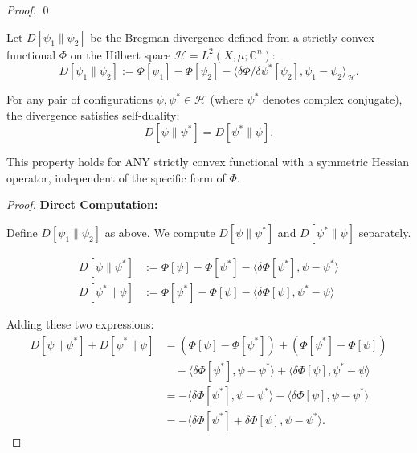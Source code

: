 \begin{theorem}
\begin{lemma}
\begin{proof}
\qed

\end{proof}

\end{lemma}

\begin{lemma}
\label{lem:bregmanSelfDualityUnderConjugation}

Let $D[\psi_1 \| \psi_2]$ be the Bregman divergence defined from a strictly convex functional $\Phi$ on the Hilbert space $\mathcal{H} = L^2(X, \mu; \mathbb{C}^n)$:
\begin{equation}
D[\psi_1 \| \psi_2] := \Phi[\psi_1] - \Phi[\psi_2] - \langle \delta\Phi/\delta\psi^*[\psi_2], \psi_1 - \psi_2 \rangle_{\mathcal{H}}.
\end{equation}

For any pair of configurations $\psi, \psi^* \in \mathcal{H}$ (where $\psi^*$ denotes complex conjugate), the divergence satisfies self-duality:
\begin{equation}
D[\psi \| \psi^*] = D[\psi^* \| \psi].
\end{equation}

This property holds for ANY strictly convex functional with a symmetric Hessian operator, independent of the specific form of $\Phi$.

\begin{proof}

\textbf{Direct Computation:}

Define $D[\psi_1 \| \psi_2]$ as above. We compute $D[\psi \| \psi^*]$ and $D[\psi^* \| \psi]$ separately.

\begin{align}
D[\psi \| \psi^*] &:= \Phi[\psi] - \Phi[\psi^*] - \langle \delta\Phi[\psi^*], \psi - \psi^* \rangle \\
D[\psi^* \| \psi] &:= \Phi[\psi^*] - \Phi[\psi] - \langle \delta\Phi[\psi], \psi^* - \psi \rangle
\end{align}

Adding these two expressions:
\begin{align}
D[\psi \| \psi^*] + D[\psi^* \| \psi] &= \left(\Phi[\psi] - \Phi[\psi^*]\right) + \left(\Phi[\psi^*] - \Phi[\psi]\right) \\
&\quad - \langle \delta\Phi[\psi^*], \psi - \psi^* \rangle + \langle \delta\Phi[\psi], \psi^* - \psi \rangle \\
&= - \langle \delta\Phi[\psi^*], \psi - \psi^* \rangle - \langle \delta\Phi[\psi], \psi - \psi^* \rangle \\
&= - \langle \delta\Phi[\psi^*] + \delta\Phi[\psi], \psi - \psi^* \rangle.
\end{align}


\end{proof}
\end{lemma}
\end{theorem}
